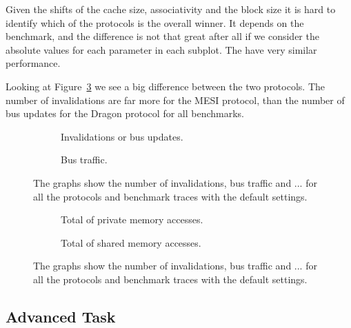 Given the shifts of the cache size, associativity and the block size it is hard to
identify which of the protocols is the overall winner. It depends on the benchmark,
and the difference is not that great after all if we consider the absolute values
for each parameter in each subplot. The have very similar performance.

Looking at Figure~\ref{fig:inv_bus} we see a big difference between the two protocols.
The number of invalidations are far more for the MESI protocol, than the number of bus
updates for the Dragon protocol for all benchmarks.



\begin{figure}[H]
    \centering
    \begin{subfigure}[b]{0.5\textwidth}
        \centering
        \caption{Invalidations or bus updates.}\label{fig:invalidations}
    \end{subfigure}%
    \hfill
    \begin{subfigure}[b]{0.5\textwidth}
        \centering
        \caption{Bus traffic.}\label{fig:bus_traffic}
    \end{subfigure}%
    \hfill
    \caption{The graphs show the number of invalidations, bus traffic and ... for all the protocols and benchmark traces with the default settings.}\label{fig:inv_bus}
\end{figure}

\begin{figure}[H]
    \centering
    \begin{subfigure}[b]{0.5\textwidth}
        \centering
        \caption{Total of private memory accesses.}\label{fig:total_private_accesses}
    \end{subfigure}%
    \hfill
    \begin{subfigure}[b]{0.5\textwidth}
        \centering
        \caption{Total of shared memory accesses.}\label{fig:total_shared_accesses}
    \end{subfigure}%
    \hfill
    \caption{The graphs show the number of invalidations, bus traffic and ... for all the protocols and benchmark traces with the default settings.}\label{fig:accesses}
\end{figure}




\subsection{Advanced Task}\label{results:advanced}

